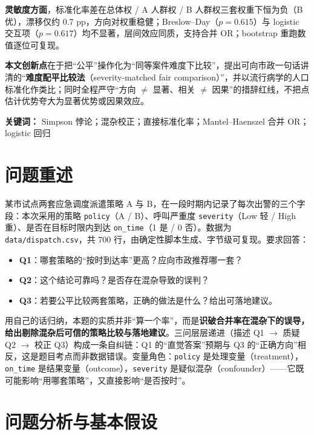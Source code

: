 \documentclass[12pt,a4paper]{ctexart}
\begin{document}
\textbf{灵敏度方面}，标准化率差在总体权 / A 人群权 / B 人群权三套权重下恒为负（B 优），漂移仅约 0.7 pp，方向对权重稳健；Breslow--Day（$p=0.615$）与 logistic 交互项（$p=0.617$）均不显著，层间效应同质，支持合并 OR；bootstrap 重跑数值逐位可复现。

\textbf{本文创新点}在于把``公平''操作化为``同等案件难度下比较''，提出可向市政一句话讲清的``\textbf{难度配平比较法}（severity-matched fair comparison）''，并以流行病学的人口标准化作类比；同时全程严守``方向 $\neq$ 显著、相关 $\neq$ 因果''的措辞红线，不把点估计优势夸大为显著优势或因果效应。

\vspace{1em}
\noindent\textbf{关键词：} Simpson 悖论；混杂校正；直接标准化率；Mantel--Haenszel 合并 OR；logistic 回归

\newpage
\tableofcontents
\newpage

\section{问题重述}
某市试点两套应急调度派遣策略 A 与 B，在一段时期内记录了每次出警的三个字段：本次采用的策略 \texttt{policy}（A / B）、呼叫严重度 \texttt{severity}（Low 轻 / High 重）、是否在目标时限内到达 \texttt{on\_time}（1 是 / 0 否）。数据为 \texttt{data/dispatch.csv}，共 700 行，由确定性脚本生成、字节级可复现。要求回答：

\begin{itemize}
\item \textbf{Q1}：哪套策略的``按时到达率''更高？应向市政推荐哪一套？
\item \textbf{Q2}：这个结论可靠吗？是否存在混杂导致的误判？
\item \textbf{Q3}：若要公平比较两套策略，正确的做法是什么？给出可落地建议。
\end{itemize}

用自己的话归纳，本题的实质并非``算一个率''，而是\textbf{识破合并率在混杂下的误导，给出剔除混杂后可信的策略比较与落地建议}。三问层层递进（描述 Q1 $\to$ 质疑 Q2 $\to$ 校正 Q3）构成一条自纠链：Q1 的``直觉答案''预期与 Q3 的``正确方向''相反，这是题目考点而非数据错误。变量角色：\texttt{policy} 是处理变量（treatment），\texttt{on\_time} 是结果变量（outcome），\texttt{severity} 是疑似混杂（confounder）——它既可能影响``用哪套策略''，又直接影响``是否按时''。

\section{问题分析与基本假设}
\end{document}
